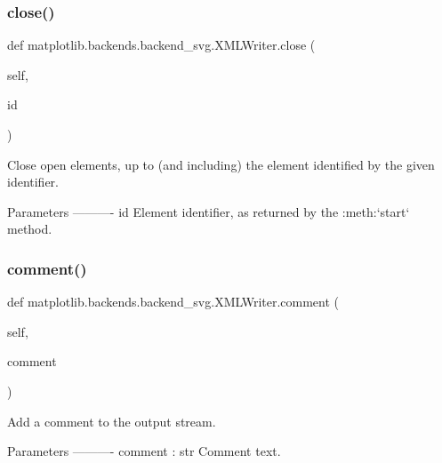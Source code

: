 \subsubsection{\texorpdfstring{close()}{close()}}
{\footnotesize\ttfamily def matplotlib.\+backends.\+backend\+\_\+svg.\+X\+M\+L\+Writer.\+close (\begin{DoxyParamCaption}\item[{}]{self,  }\item[{}]{id }\end{DoxyParamCaption})}

\begin{DoxyVerb}Close open elements, up to (and including) the element identified
by the given identifier.

Parameters
----------
id
    Element identifier, as returned by the :meth:`start` method.
\end{DoxyVerb}
 \mbox{\label{classmatplotlib_1_1backends_1_1backend__svg_1_1XMLWriter_a84f4a452f0e8080a7714a81b100a6aaf}} 
\subsubsection{\texorpdfstring{comment()}{comment()}}
{\footnotesize\ttfamily def matplotlib.\+backends.\+backend\+\_\+svg.\+X\+M\+L\+Writer.\+comment (\begin{DoxyParamCaption}\item[{}]{self,  }\item[{}]{comment }\end{DoxyParamCaption})}

\begin{DoxyVerb}Add a comment to the output stream.

Parameters
----------
comment : str
    Comment text.
\end{DoxyVerb}
 \mbox{\label{classmatplotlib_1_1backends_1_1backend__svg_1_1XMLWriter_a2e49d656afb2c9a67260e8ebabc6a0ae}} 
